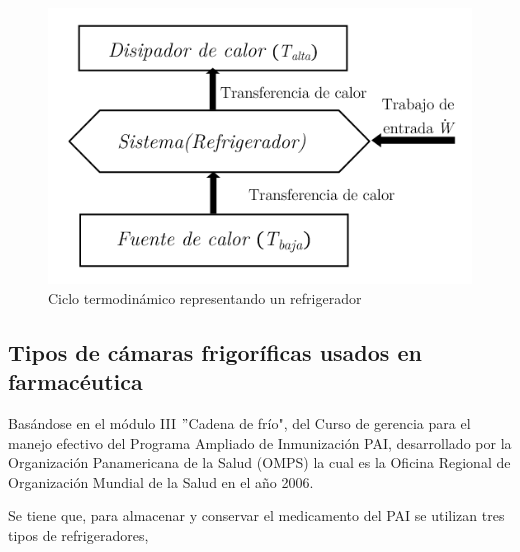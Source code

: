 \begin{figure}[H]
	\centering
	\includegraphics[width=0.7\linewidth]{figures/ciclo-termo}
	\caption{Ciclo termodinámico representando un refrigerador}
	\label{fig:ciclo-termo}
\end{figure}

\subsection{Tipos de cámaras frigoríficas usados en farmacéutica}



Basándose en el módulo III $"$Cadena de frío", del Curso de gerencia para el manejo efectivo del Programa Ampliado de Inmunización PAI, desarrollado por la Organización Panamericana de la Salud (OMPS) la cual es la Oficina Regional de Organización Mundial de la Salud en el año 2006. 

Se tiene que, para almacenar y conservar el medicamento del PAI se utilizan tres tipos de refrigeradores, 

